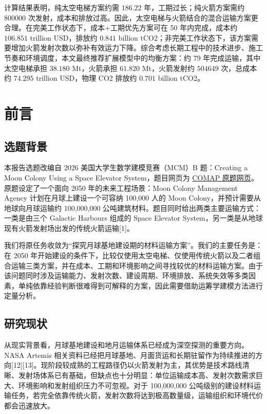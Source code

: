 \documentclass[12pt,a4paper,UTF8]{article}
\begin{document}
计算结果表明，纯太空电梯方案约需 \(186.22\) 年，工期过长；纯火箭方案需约 \(800000\) 次发射，成本和排放过高。因此，太空电梯与火箭结合的混合运输方案更合理。在完美工作状态下，成本+工期优先方案可在 50 年内完成，成本约 \(106.851\) trillion USD，排放约 \(0.841\) billion tCO2；非完美工作状态下，该方案需要增加火箭发射次数以弥补有效运力下降。综合考虑长期工程中的技术进步、施工节奏和环境调度，本文最终推荐扩展模型中的均衡方案：约 79 年完成运输，其中太空电梯承担 \(38.180\) Mt，火箭承担 \(61.820\) Mt，火箭发射约 \(504649\) 次，总成本约 \(74.295\) trillion USD，物理 CO2 排放约 \(0.701\) billion tCO2。

\clearpage
\section{前言}

\subsection{选题背景}

本报告选题改编自 2026 美国大学生数学建模竞赛（MCM）B 题：Creating a Moon Colony Using a Space Elevator System，题目网页为 \href{https://www.comap.org/membership/member-resources/item/creating-a-moon-colony-using-a-space-elevator-system}{COMAP 原题网页}。原题设定了一个面向 2050 年的未来工程场景：Moon Colony Management Agency 计划在月球上建设一个可容纳 100,000 人的 Moon Colony，并预计需要从地球向月球运输约 100,000,000 公吨建筑材料。题目同时给出两类主要运输方式：一类是由三个 Galactic Harbours 组成的 Space Elevator System，另一类是从地球现有火箭发射场出发的传统火箭运输[1]。

我们将原任务收敛为“探究月球基地建设期的材料运输方案”。我们的主要任务是：在 2050 年开始建设的条件下，比较仅使用太空电梯、仅使用传统火箭以及二者组合运输三类方案，并在成本、工期和环境影响之间寻找较优的材料运输方案。由于该问题同时涉及运输能力、发射次数、建设周期、环境排放、系统失效等多类因素，单纯依靠经验判断很难得到可解释的方案，因此需要借助运筹学建模方法进行定量分析。

\subsection{研究现状}

从现实背景看，月球基地建设和地月运输体系已经成为深空探测的重要方向。NASA Artemis 相关资料已经把月球基地、月面货运和长期驻留作为持续推进的方向[12][13]。现阶段较成熟的工程路径仍以火箭发射为主，其优势是技术路线清晰、发射场体系已有基础，但缺点也十分明显：单位运输成本高、发射次数需求巨大、环境影响和发射组织压力不可忽视。对于 100,000,000 公吨级别的建设材料运输任务，若完全依靠传统火箭，发射次数将达到极高数量级，运输组织和环境代价都会迅速放大。
\end{document}
